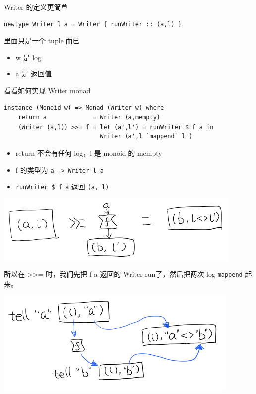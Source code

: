 \documentclass[letterspacing]{tufte-book}
\begin{document}
Writer 的定义更简单
\lstset{language=haskell,label= ,caption= ,captionpos=b,numbers=none}
\begin{lstlisting}
newtype Writer l a = Writer { runWriter :: (a,l) }
\end{lstlisting}
里面只是一个 tuple 而已
\begin{itemize}
\item w 是 log
\item a 是 返回值
\end{itemize}

看看如何实现 Writer monad
\lstset{language=haskell,label= ,caption= ,captionpos=b,numbers=none}
\begin{lstlisting}
instance (Monoid w) => Monad (Writer w) where
    return a             = Writer (a,mempty)
    (Writer (a,l)) >>= f = let (a',l') = runWriter $ f a in
                           Writer (a',l `mappend` l')
\end{lstlisting}

\begin{itemize}
\item return 不会有任何 log，l 是 monoid 的 mempty
\item f 的类型为 \texttt{a -> Writer l a}
\item \texttt{runWriter \$ f a} 返回 \texttt{(a, l)}
\end{itemize}

\begin{center}
\includegraphics[width=.9\linewidth]{images/p2-writer-monad.png}
\end{center}

所以在 >>= 时，我们先把 f a 返回的 Writer run了，然后把两次 log \texttt{mappend} 起来。
\begin{center}
\includegraphics[width=.9\linewidth]{images/p2-writer-monad-bind.png}
\end{center}
\end{document}
